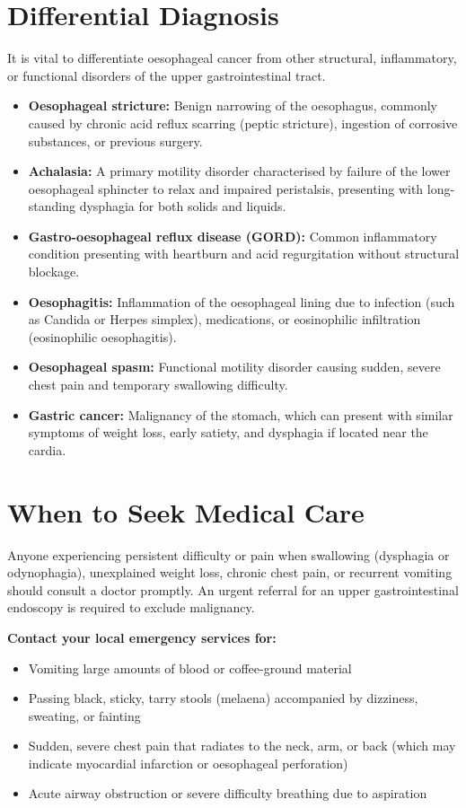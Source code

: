 \section*{Differential Diagnosis}
It is vital to differentiate oesophageal cancer from other structural, inflammatory, or functional disorders of the upper gastrointestinal tract.
\begin{itemize}
    \item \textbf{Oesophageal stricture:} Benign narrowing of the oesophagus, commonly caused by chronic acid reflux scarring (peptic stricture), ingestion of corrosive substances, or previous surgery.
    \item \textbf{Achalasia:} A primary motility disorder characterised by failure of the lower oesophageal sphincter to relax and impaired peristalsis, presenting with long-standing dysphagia for both solids and liquids.
    \item \textbf{Gastro-oesophageal reflux disease (GORD):} Common inflammatory condition presenting with heartburn and acid regurgitation without structural blockage.
    \item \textbf{Oesophagitis:} Inflammation of the oesophageal lining due to infection (such as Candida or Herpes simplex), medications, or eosinophilic infiltration (eosinophilic oesophagitis).
    \item \textbf{Oesophageal spasm:} Functional motility disorder causing sudden, severe chest pain and temporary swallowing difficulty.
    \item \textbf{Gastric cancer:} Malignancy of the stomach, which can present with similar symptoms of weight loss, early satiety, and dysphagia if located near the cardia.
\end{itemize}

\section*{When to Seek Medical Care}
Anyone experiencing persistent difficulty or pain when swallowing (dysphagia or odynophagia), unexplained weight loss, chronic chest pain, or recurrent vomiting should consult a doctor promptly. An urgent referral for an upper gastrointestinal endoscopy is required to exclude malignancy.

\textbf{Contact your local emergency services for:}
\begin{itemize}
    \item Vomiting large amounts of blood or coffee-ground material
    \item Passing black, sticky, tarry stools (melaena) accompanied by dizziness, sweating, or fainting
    \item Sudden, severe chest pain that radiates to the neck, arm, or back (which may indicate myocardial infarction or oesophageal perforation)
    \item Acute airway obstruction or severe difficulty breathing due to aspiration
\end{itemize}

